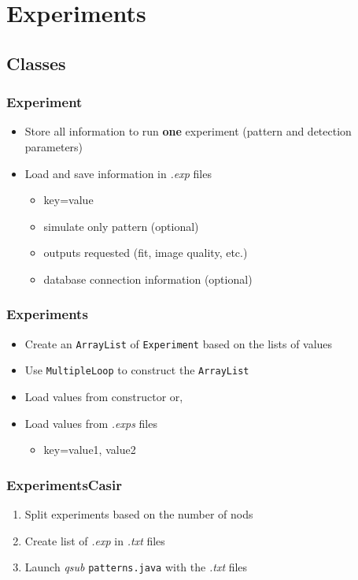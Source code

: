 \documentclass[legalpaper]{article}
\begin{document}
\newpage

\section{Experiments}

\subsection{Classes}

\subsubsection{Experiment}
\begin{itemize}
  \item Store all information to run \textbf{one} experiment (pattern and detection parameters)
  \item Load and save information in \emph{.exp} files
    \begin{itemize}
      \item key=value
      \item simulate only pattern (optional)
      \item outputs requested (fit, image quality, etc.)
      \item database connection information (optional)
    \end{itemize}
\end{itemize}

\subsubsection{Experiments}
\begin{itemize}
  \item Create an \texttt{ArrayList} of \texttt{Experiment} based on the lists of values
  \item Use \texttt{MultipleLoop} to construct the \texttt{ArrayList}
  \item Load values from constructor or,
  \item Load values from \emph{.exps} files
    \begin{itemize}
      \item key=value1, value2
    \end{itemize}
\end{itemize}

\subsubsection{ExperimentsCasir}
  \begin{enumerate}
    \item Split experiments based on the number of nods
    \item Create list of \emph{.exp} in \emph{.txt} files
    \item Launch \emph{qsub} \texttt{patterns.java} with the \emph{.txt} files
  \end{enumerate}
\end{document}
